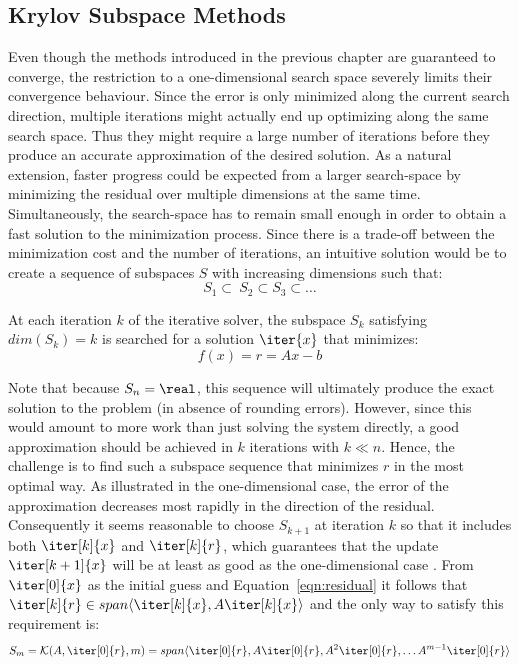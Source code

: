 \subsection{Krylov Subspace Methods}
\label{sec:krylov_methods}

Even though the methods introduced in the previous chapter are guaranteed to converge, the restriction to a one-dimensional search space severely limits their convergence behaviour. Since the error is only minimized along the current search direction, multiple iterations might actually end up optimizing along the same search space. Thus they might require a large number of iterations before they produce an accurate approximation of the desired solution. As a natural extension, faster progress could be expected from a larger search-space by minimizing the residual over multiple dimensions at the same time. Simultaneously, the search-space has to remain small enough in order to obtain a fast solution to the minimization process. Since there is a trade-off between the minimization cost and the number of iterations, an intuitive solution would be to create a sequence of subspaces $S$ with increasing dimensions such that:
\begin{equation}
    S_1 \subset \ S_2 \subset S_3 \subset \dots
\end{equation}

\noindent At each iteration $k$ of the iterative solver, the subspace $S_k$ satisfying $dim(S_k)=k$ is searched for a solution $\iter{x}$ that minimizes:
\begin{equation}
\label{eqn:residual}
    f(x)= r = Ax-b
\end{equation}

\noindent Note that because $S_n=\real$, this sequence will ultimately produce the exact solution to the problem (in absence of rounding errors). However, since this would amount to more work than just solving the system directly, a good approximation should be achieved in $k$ iterations with $k \ll n$. Hence, the challenge is to find such a subspace sequence that minimizes $r$ in the most optimal way. As illustrated in the one-dimensional case, the error of the approximation decreases most rapidly in the direction of the residual. Consequently it seems reasonable to choose $S_{k+1}$ at iteration $k$ so that it includes both $\iter[k]{x}$ and $\iter[k]{r}$, which guarantees that the update $\iter[k+1]{x}$ will be at least as good as the one-dimensional case \cite{golub_matrix_2013}. From $\iter[0]{x}$ as the initial guess and Equation~\hyperref[eqn:residual]{\ref{eqn:residual}} it follows that $\iter[k]{r} \in span\langle\iter[k]{x},A\iter[k]{x}\rangle$ and the only way to satisfy this requirement is:
\begin{equation}
    S_m=\mathcal{K}(A,\iter[0]{r}, m) = span\langle\iter[0]{r}, A\iter[0]{r}, A^2\iter[0]{r},\dots A^{m-1}\iter[0]{r}\rangle
\end{equation}

